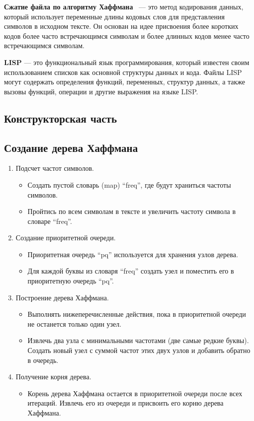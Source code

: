 \documentclass[12pt, a4paper]{article}
\begin{document}
\textbf{Сжатие файла по алгоритму Хаффмана}~\cite{book} --- это метод кодирования данных, который использует переменные длины кодовых слов для представления символов в исходном тексте. Он основан на идее присвоения более коротких кодов более часто встречающимся символам и более длинных кодов менее часто встречающимся символам.

\textbf{LISP} --- это  функциональный язык программирования, который известен своим использованием списков как основной структуры данных и кода. Файлы LISP могут содержать определения функций, переменных, структур данных, а также вызовы функций, операции и другие выражения на языке LISP.

\newpage
\begin{center}
    \section{Конструкторская часть}
\end{center}

\subsection{Создание дерева Хаффмана}
\begin{enumerate}
    \item Подсчет частот символов.
    \begin{itemize}
        \item[---] Создать пустой словарь (map) ``freq'', где будут храниться частоты символов.
        \item[---] Пройтись по всем символам в тексте и увеличить частоту символа в словаре ``freq''. 
    \end{itemize}
    \item Создание приоритетной очереди.
        \begin{itemize}
        \item[---] Приоритетная очередь ``pq'' используется для хранения узлов дерева.
        \item[---] Для каждой буквы из словаря ``freq'' создать узел и поместить его в приоритетную очередь ``pq''. 
    \end{itemize}
    \item Построение дерева Хаффмана.
        \begin{itemize}
        \item[---] Выполнять нижеперечисленные действия, пока в приоритетной очереди не останется только один узел.
        \item[---] Извлечь два узла с минимальными частотами (две самые редкие буквы). Создать новый узел с суммой частот этих двух узлов и добавить обратно в очередь.
    \end{itemize}
    \item Получение корня дерева.
    \begin{itemize}
        \item[---] Корень дерева Хаффмана остается в приоритетной очереди после всех итераций. Извлечь его из очереди и присвоить его корню дерева Хаффмана.
    \end{itemize}
\end{enumerate}
\end{document}
